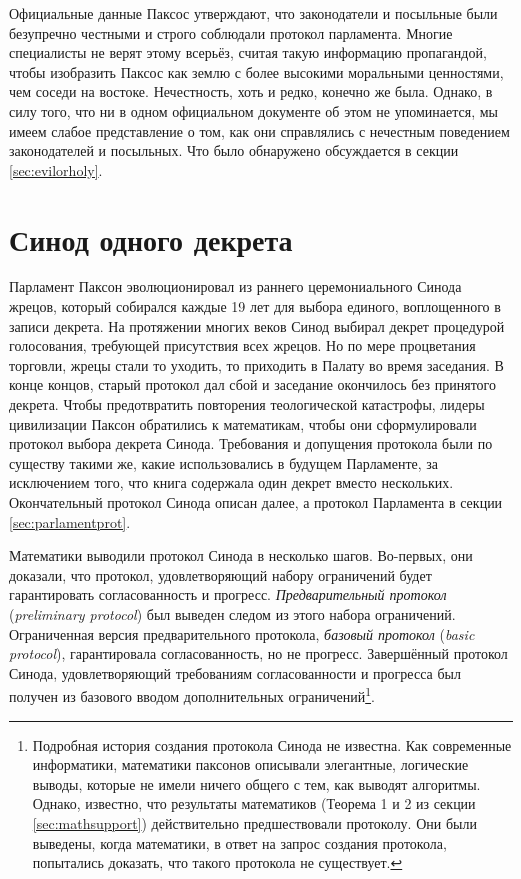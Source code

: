 \documentclass[12pt, a4paper]{article} %
\begin{document}
Официальные данные Паксос утверждают, что законодатели и посыльные были безупречно честными и строго соблюдали протокол парламента. Многие специалисты не верят этому всерьёз, считая такую информацию пропагандой, чтобы изобразить Паксос как землю с более высокими моральными ценностями, чем соседи на востоке. Нечестность, хоть и редко, конечно же была. Однако, в силу того, что ни в одном официальном документе об этом не упоминается, мы имеем слабое представление о том, как они справлялись с нечестным поведением законодателей и посыльных. Что было обнаружено обсуждается в секции \ref{sec:evilorholy}.

\section{Синод одного декрета}

Парламент Паксон эволюционировал из раннего церемониального Синода жрецов, который собирался каждые 19 лет для выбора единого, воплощенного в записи декрета. На протяжении многих веков Синод выбирал декрет процедурой голосования, требующей присутствия всех жрецов. Но по мере процветания торговли, жрецы стали то уходить, то приходить в Палату во время заседания. В конце концов, старый протокол дал сбой и заседание окончилось без принятого декрета. Чтобы предотвратить повторения теологической катастрофы, лидеры цивилизации Паксон обратились к математикам, чтобы они сформулировали протокол выбора декрета Синода. Требования и допущения протокола были по существу такими же, какие использовались в будущем Парламенте, за исключением того, что книга содержала один декрет вместо нескольких. Окончательный протокол Синода описан далее, а протокол Парламента в секции \ref{sec:parlamentprot}.

Математики выводили протокол Синода в несколько шагов. Во-первых, они доказали, что протокол, удовлетворяющий набору ограничений будет гарантировать согласованность  и прогресс. \textit{Предварительный протокол} (\textit{preliminary protocol}) был выведен следом из этого набора ограничений. Ограниченная  версия предварительного протокола, \textit{базовый протокол} (\textit{basic protocol}), гарантировала согласованность, но не прогресс. Завершённый протокол Синода, удовлетворяющий требованиям согласованности и прогресса был получен из базового вводом дополнительных ограничений\footnote{Подробная история создания протокола Синода не известна. Как современные информатики, математики паксонов описывали элегантные, логические выводы, которые не имели ничего общего с тем, как выводят алгоритмы. Однако, известно, что результаты математиков (Теорема 1 и 2 из секции \ref{sec:mathsupport}) действительно предшествовали протоколу. Они были выведены, когда математики, в ответ на запрос создания протокола, попытались доказать, что такого протокола не существует.
}.
\end{document}
